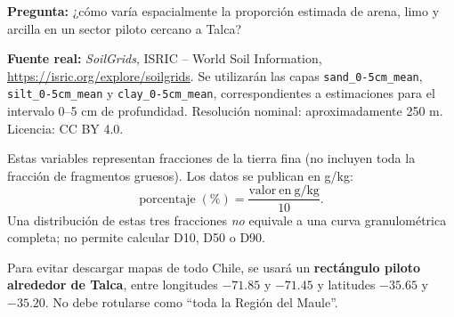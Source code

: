 \documentclass[11pt,a4paper]{article}
\begin{document}
\textbf{Pregunta:} ¿cómo varía espacialmente la proporción estimada de arena,
limo y arcilla en un sector piloto cercano a Talca?

\textbf{Fuente real:} \emph{SoilGrids}, ISRIC -- World Soil Information,
\url{https://isric.org/explore/soilgrids}. Se utilizarán las capas
\texttt{sand\_0-5cm\_mean}, \texttt{silt\_0-5cm\_mean} y
\texttt{clay\_0-5cm\_mean}, correspondientes a estimaciones para el
intervalo 0--5 cm de profundidad. Resolución nominal: aproximadamente
250 m. Licencia: CC BY 4.0.

Estas variables representan fracciones de la tierra fina (no incluyen toda la
fracción de fragmentos gruesos). Los datos se publican en g/kg:
\[
\mathrm{porcentaje}\;(\%)=\frac{\mathrm{valor\ en\ g/kg}}{10}.
\]
Una distribución de estas tres fracciones \emph{no} equivale a una curva
granulométrica completa; no permite calcular D10, D50 o D90.

Para evitar descargar mapas de todo Chile, se usará un \textbf{rectángulo
piloto alrededor de Talca}, entre longitudes $-71.85$ y $-71.45$ y
latitudes $-35.65$ y $-35.20$. No debe rotularse como ``toda la Región del Maule''.
\end{document}
